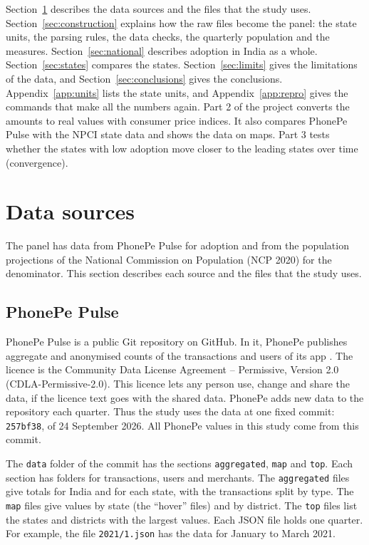 \documentclass[11pt,a4paper]{article}
\begin{document}
Section~\ref{sec:data} describes the data sources and the files that the study uses. Section~\ref{sec:construction} explains how the raw files become the panel: the state units, the parsing rules, the data checks, the quarterly population and the measures. Section~\ref{sec:national} describes adoption in India as a whole. Section~\ref{sec:states} compares the states. Section~\ref{sec:limits} gives the limitations of the data, and Section~\ref{sec:conclusions} gives the conclusions. Appendix~\ref{app:units} lists the state units, and Appendix~\ref{app:repro} gives the commands that make all the numbers again. Part 2 of the project converts the amounts to real values with consumer price indices. It also compares PhonePe Pulse with the NPCI state data and shows the data on maps. Part 3 tests whether the states with low adoption move closer to the leading states over time (convergence).

\section{Data sources}\label{sec:data}
The panel has data from PhonePe Pulse for adoption and from the population projections of the National Commission on Population (NCP 2020) for the denominator. This section describes each source and the files that the study uses.

\subsection{PhonePe Pulse}\label{sec:pulse}
PhonePe Pulse is a public Git repository on GitHub. In it, PhonePe publishes aggregate and anonymised counts of the transactions and users of its app \citep{phonepe_pulse}. The licence is the Community Data License Agreement -- Permissive, Version 2.0 (CDLA-Permissive-2.0). This licence lets any person use, change and share the data, if the licence text goes with the shared data. PhonePe adds new data to the repository each quarter. Thus the study uses the data at one fixed commit: \texttt{257bf38}, of 24 September 2026. All PhonePe values in this study come from this commit.

The \texttt{data} folder of the commit has the sections \texttt{aggregated}, \texttt{map} and \texttt{top}. Each section has folders for transactions, users and merchants. The \texttt{aggregated} files give totals for India and for each state, with the transactions split by type. The \texttt{map} files give values by state (the ``hover'' files) and by district. The \texttt{top} files list the states and districts with the largest values. Each JSON file holds one quarter. For example, the file \texttt{2021/1.json} has the data for January to March 2021.
\end{document}
